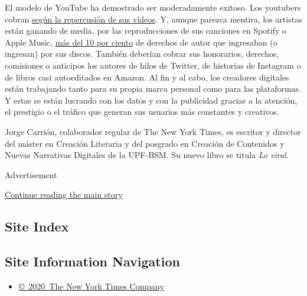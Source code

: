 El modelo de YouTube ha demostrado ser moderadamente exitoso. Los
youtubers cobran
\href{https://www.nytimes3xbfgragh.onion/2008/12/11/business/media/11youtube.html}{según
la repercusión de sus vídeos}. Y, aunque parezca mentira, los artistas
están ganando de media, por las reproducciones de sus canciones en
Spotify o Apple Music,
\href{https://www.businessinsider.es/cuantas-reproducciones-spotify-necesitan-ganar-1-euro-491653}{más
del 10 por ciento} de derechos de autor que ingresaban (o ingresan) por
sus discos. También deberían cobrar sus honorarios, derechos, comisiones
o anticipos los autores de hilos de Twitter, de historias de Instagram o
de libros casi autoeditados en Amazon. Al fin y al cabo, los creadores
digitales están trabajando tanto para su propia marca personal como para
las plataformas. Y estas se están lucrando con los datos y con la
publicidad gracias a la atención, el prestigio o el tráfico que generan
sus usuarios más constantes y creativos.

Jorge Carrión, colaborador regular de The New York Times, es escritor y
director del máster en Creación Literaria y del posgrado en Creación de
Contenidos y Nuevas Narrativas Digitales de la UPF-BSM. Su nuevo libro
se titula \emph{Lo viral}.

Advertisement

\protect\hyperlink{after-bottom}{Continue reading the main story}

\hypertarget{site-index}{%
\subsection{Site Index}\label{site-index}}

\hypertarget{site-information-navigation}{%
\subsection{Site Information
Navigation}\label{site-information-navigation}}

\begin{itemize}
\tightlist
\item
  \href{https://help.nytimes3xbfgragh.onion/hc/en-us/articles/115014792127-Copyright-notice}{©~2020~The
  New York Times Company}
\end{itemize}

